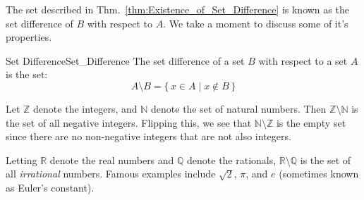         The set described in Thm.~\ref{thm:Existence_of_Set_Difference} is known
        as the set difference of $B$ with respect to $A$. We take a moment to
        discuss some of it's properties.
        \begin{fdefinition}{Set Difference}{Set_Difference}
            The set difference of a set $B$ with respect to a set $A$ is the
            set:
            \begin{equation*}
                A\setminus{B}=\{\,x\in{A}\;|\;x\notin{B}\,\}
            \end{equation*}
        \end{fdefinition}
        \begin{example}
            Let $\mathbb{Z}$ denote the integers, and $\mathbb{N}$ denote the
            set of natural numbers. Then $\mathbb{Z}\setminus\mathbb{N}$ is the
            set of all negative integers. Flipping this, we see that
            $\mathbb{N}\setminus\mathbb{Z}$ is the empty set since there are no
            non-negative integers that are not also integers.
        \end{example}
        \begin{example}
            Letting $\mathbb{R}$ denote the real numbers and $\mathbb{Q}$ denote
            the rationals, $\mathbb{R}\setminus\mathbb{Q}$ is the set of all
            \textit{irrational} numbers. Famous examples include $\sqrt{2}$,
            $\pi$, and $e$ (sometimes known as Euler's constant).
        \end{example}
